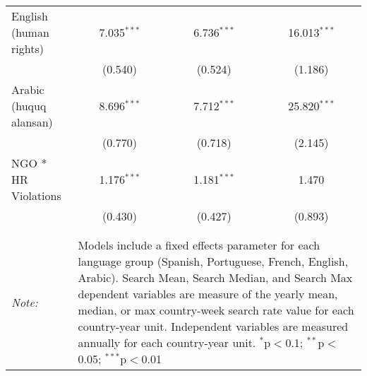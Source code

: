 \begin{table}[!htbp]
\begin{tabular}{@{\extracolsep{5pt}}lccc}
  English (human rights) & 7.035$^{***}$ & 6.736$^{***}$ & 16.013$^{***}$ \\ 
  & (0.540) & (0.524) & (1.186) \\ 
  Arabic (huquq alansan) & 8.696$^{***}$ & 7.712$^{***}$ & 25.820$^{***}$ \\ 
  & (0.770) & (0.718) & (2.145) \\ 
  NGO * HR Violations & 1.176$^{***}$ & 1.181$^{***}$ & 1.470 \\ 
  & (0.430) & (0.427) & (0.893) \\ 
 \hline \\[-1.8ex] 
\hline 
\hline \\[-1.8ex] 
\textit{Note:}  & \multicolumn{3}{l}{\parbox[t]{8cm}{Models include a fixed effects parameter for each language group (Spanish, Portuguese, French, English, Arabic). Search Mean, Search Median, and Search Max dependent variables are measure of the yearly mean, median, or max country-week search rate value for each country-year unit. Independent variables are measured annually for each country-year unit. $^{*}$p$<$0.1; $^{**}$p$<$0.05; $^{***}$p$<$0.01}} \\ 
\end{tabular} 
\end{table} 
